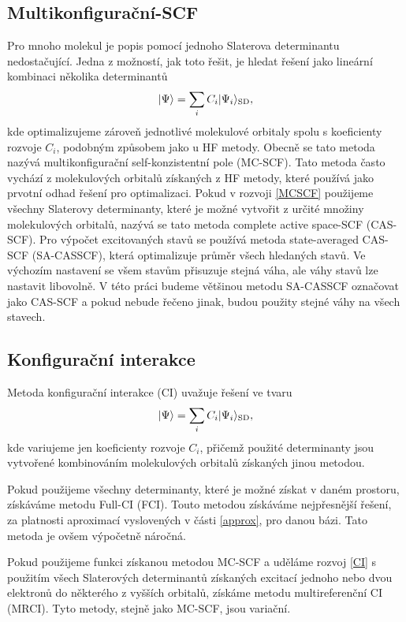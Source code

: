 \subsection{Multikonfigurační-SCF}
Pro mnoho molekul je popis pomocí jednoho Slaterova determinantu nedostačující.
Jedna z možností, jak toto řešit, je hledat řešení jako lineární kombinaci několika determinantů
\begin{equation}
| \Psi \rangle = \sum_i C_i | \Psi_i \rangle_{\mathrm{SD}}, \label{MCSCF}
\end{equation}
kde optimalizujeme zároveň jednotlivé molekulové orbitaly spolu s koeficienty rozvoje $C_i$, 
podobným způsobem jako u HF metody.
Obecně se tato metoda nazývá multikonfigurační self-konzistentní pole (MC-SCF).
Tato metoda často vychází z molekulových orbitalů získaných z HF metody, které používá jako 
prvotní odhad řešení pro optimalizaci.
Pokud v rozvoji \eqref{MCSCF} použijeme všechny Slaterovy determinanty, které je možné  
vytvořit z určité množiny molekulových orbitalů, nazývá se tato metoda complete active 
space-SCF (CAS-SCF). Pro výpočet excitovaných stavů se používá metoda state-averaged CAS-SCF (SA-CASSCF), která optimalizuje průměr všech hledaných stavů. Ve výchozím nastavení se všem stavům přisuzuje stejná váha, ale váhy stavů lze nastavit libovolně.
V této práci budeme většinou metodu SA-CASSCF označovat jako CAS-SCF a pokud nebude řečeno jinak, budou použity stejné váhy na všech stavech.

\subsection{Konfigurační interakce}
Metoda konfigurační interakce (CI) uvažuje řešení ve tvaru
\begin{equation}
| \Psi \rangle = \sum_i C_i | \Psi_i \rangle_{\mathrm{SD}}, \label{CI}
\end{equation}
kde variujeme jen koeficienty rozvoje $C_i$, přičemž použité determinanty jsou 
vytvořené kombinováním molekulových orbitalů získaných jinou metodou. 

Pokud použijeme všechny determinanty, které je možné získat v daném prostoru, 
získáváme metodu Full-CI (FCI). Touto metodou získáváme nejpřesnější řešení, za 
platnosti aproximací vyslovených v části \ref{approx}, pro danou bázi. Tato metoda je 
ovšem výpočetně náročná.

Pokud použijeme funkci získanou metodou MC-SCF a uděláme rozvoj \ref{CI} s použitím všech Slaterových determinantů získaných 
excitací jednoho nebo dvou elektronů do některého z vyšších orbitalů,
získáme metodu
multireferenční CI (MRCI). Tyto metody, stejně jako MC-SCF, jsou variační.

